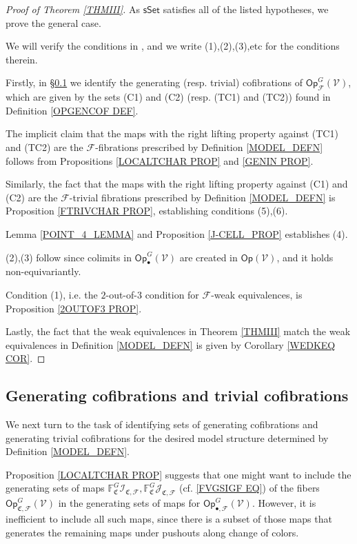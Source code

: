 \documentclass[a4paper,10pt
,draft
]{article}%
\numberwithin{equation}{section}
\numberwithin{figure}{section}
\theoremstyle{definition} %
\newcommand{\sSet}{\ensuremath{\mathsf{sSet}}}%
\newcommand{\Op}{\mathsf{Op}}%
\newcommand{\F}{\ensuremath{\mathcal F}}
\newcommand{\V}{\ensuremath{\mathcal V}}
\newcommand{\1}{\ensuremath{\mathbbm 1}}%
\begin{document}
\begin{proof}[Proof of Theorem \ref{THMIII}]
      As $\sSet$ satisfies all of the listed hypotheses, we prove the general case.

      We will verify the conditions in 
\cite[Theorem 2.1.19]{Hov99}, and we write (1),(2),(3),etc for the conditions therein.

Firstly, in \S \ref{GENCOF SEC} we identify
the generating (resp. trivial) cofibrations of $\mathsf{Op}^G_{\F}(\V)$,
which are given by the sets 
(C1) and (C2) (resp. (TC1) and (TC2))
found in Definition \ref{OPGENCOF DEF}.

The implicit claim that the maps
with the right lifting property against 
(TC1) and (TC2)
are the $\F$-fibrations prescribed by 
Definition \ref{MODEL_DEFN}
follows from Propositions \ref{LOCALTCHAR PROP} and \ref{GENIN PROP}.

Similarly, the fact that the maps
with the right lifting property against 
(C1) and (C2) are the 
$\F$-trivial fibrations prescribed by 
Definition \ref{MODEL_DEFN}
is Proposition \ref{FTRIVCHAR PROP}, 
establishing conditions (5),(6).

Lemma \ref{POINT_4_LEMMA} and Proposition \ref{J-CELL_PROP} establishes (4).

(2),(3) follow since colimits in $\mathsf{Op}^G_\bullet(\V)$ are created in $\Op(\V)$, and it holds non-equivariantly.

Condition (1), i.e. the $2$-out-of-$3$ condition for $\F$-weak equivalences, 
is Proposition \ref{2OUTOF3 PROP}.

Lastly, the fact that the weak equivalences in 
Theorem \ref{THMIII}
match the weak equivalences in
Definition \ref{MODEL_DEFN} is given by 
Corollary \ref{WEDKEQ COR}.
\end{proof}





\subsection{Generating cofibrations and trivial cofibrations}
\label{GENCOF SEC}

We next turn to the task of identifying sets of generating cofibrations and generating trivial cofibrations
for the desired model structure determined by Definition \ref{MODEL_DEFN}.


Proposition \ref{LOCALTCHAR PROP} suggests that one might want to include the generating sets of maps
$\mathbb{F}^G_{\mathfrak{C}} \mathcal{I}_{\mathfrak{C},\mathcal{F}},
\mathbb{F}^G_{\mathfrak{C}} \mathcal{J}_{\mathfrak{C},\mathcal{F}}$
(cf. \eqref{FVGSIGF EQ}) of the fibers 
$\mathsf{Op}^G_{\mathfrak{C},\F}(\V)$
in the generating sets of maps for 
$\mathsf{Op}^G_{\bullet,\F}(\V)$.
However, it is inefficient to include all such maps, 
since there is a subset of those maps
that generates the remaining maps under pushouts along change of colors.
\end{document}
